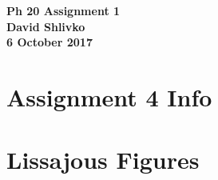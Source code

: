\documentclass{article}
\begin{document}
\begin{center}
\textbf{\huge{Ph 20 Assignment 1}} \\
\textbf{\Large{David Shlivko}} \\
\textbf{\large{6 October 2017}}
\end{center}

\section{Assignment 4 Info}





\section{Lissajous Figures}
\end{document}
